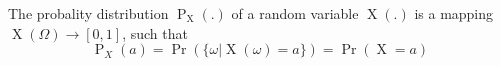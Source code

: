 The probality distribution $\operatorname{P}_{\operatorname{X}}(.)$ of a random variable $\operatorname{X}(.)$ is a mapping $\operatorname{X}(\Omega) \to [0, 1]$, such that
$$\operatorname{P}_X(a) = \operatorname{Pr}(\{\omega | \operatorname{X}(\omega) = a\}) = \operatorname{Pr}(\operatorname{X} = a)$$
